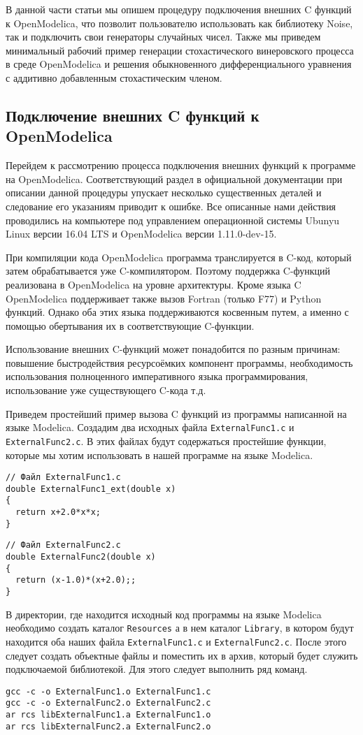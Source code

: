 \documentclass[%
floatfix,
showkeys,
nofootinbib, %
superscriptaddress, %
]{revtex4-1}
\begin{document}
В данной части статьи мы опишем процедуру подключения внешних C
функций к OpenModelica, что позволит пользователю использовать как
библиотеку Noise, так и подключить свои генераторы случайных
чисел. Также мы приведем минимальный рабочий пример генерации
стохастического винеровского процесса в среде OpenModelica и решения
обыкновенного дифференциального уравнения с аддитивно добавленным
стохастическим членом.

\subsection{Подключение внешних C функций к OpenModelica}

Перейдем к рассмотрению процесса подключения внешних функций к
программе на OpenModelica. Соответствующий раздел в официальной
документации при описании данной процедуры упускает несколько
существенных деталей и следование его указаниям приводит к ошибке. Все
описанные нами действия проводились на компьютере под управлением
операционной системы Ubunyu Linux версии 16.04 LTS и OpenModelica
версии 1.11.0-dev-15.

При компиляции кода OpenModelica программа транслируется в C-код,
который затем обрабатывается уже C-компилятором. Поэтому поддержка
C-функций реализована в OpenModelica на уровне архитектуры. Кроме
языка C OpenModelica поддерживает также вызов Fortran (только F77) и
Python функций. Однако оба этих языка поддерживаются косвенным путем,
а именно с помощью обертывания их в соответствующие C-функции.

Использование внешних C-функций может понадобится по разным причинам:
повышение быстродействия ресурсоёмких компонент программы,
необходимость использования полноценного императивного языка
программирования, использование уже существующего C-кода т.д.

Приведем простейший пример вызова C функций из программы написанной на
языке Modelica. Создадим два исходных файла \verb|ExternalFunc1.c| и
\verb|ExternalFunc2.c|. В этих файлах будут содержаться простейшие
функции, которые мы хотим использовать в нашей программе на языке
Modelica.

\begin{verbatim}
// Файл ExternalFunc1.c
double ExternalFunc1_ext(double x)
{
  return x+2.0*x*x;
}
\end{verbatim}
\begin{verbatim}
// Файл ExternalFunc2.c
double ExternalFunc2(double x)
{
  return (x-1.0)*(x+2.0);;
}
\end{verbatim}
В директории, где находится исходный код программы на языке Modelica
необходимо создать каталог \verb|Resources| а в нем каталог
\verb|Library|, в котором будут находится оба наших файла
\verb|ExternalFunc1.c| и \verb|ExternalFunc2.c|. После этого следует
создать объектные файлы и поместить их в архив, который будет служить
подключаемой библиотекой. Для этого следует выполнить ряд команд.
\begin{verbatim}
gcc -c -o ExternalFunc1.o ExternalFunc1.c
gcc -c -o ExternalFunc2.o ExternalFunc2.c
ar rcs libExternalFunc1.a ExternalFunc1.o
ar rcs libExternalFunc2.a ExternalFunc2.o
\end{verbatim}
\end{document}
